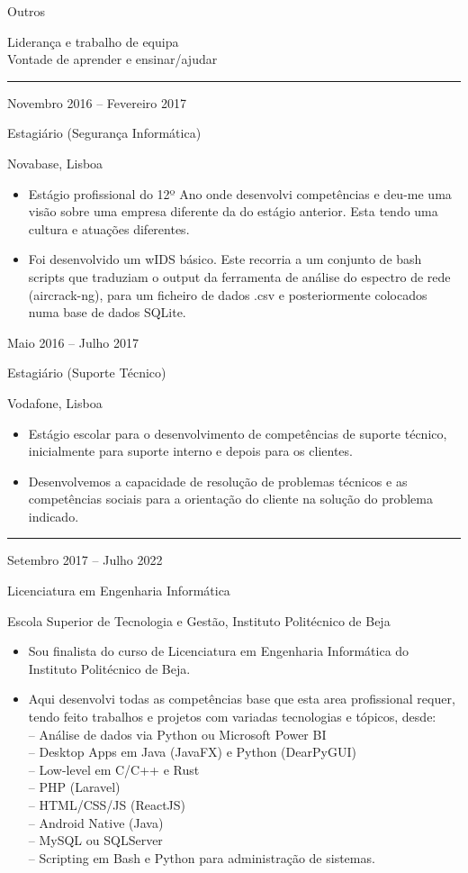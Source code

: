 \documentclass[a4paper,10pt]{article}
\newlength{\cvcolumngapwidth}
\newlength{\cvleftcolumnwidth}
\newlength{\cvrightcolumnwidth}
\newcommand{\cvsectionstyle}[1]{{\normalsize\cvsectionfont\textcolor{cvsectioncolor}{#1}}}
\newcommand{\cvtitlestyle}[1]{{\large\cvtitlefont\textcolor{cvtitlecolor}{#1}}}
\newcommand{\cvdurationstyle}[1]{{\small\cvdurationfont\textcolor{cvdurationcolor}{#1}}}
\newlength{\cvafteritemskipamount}
\newlength{\cvaftersectionskipamount}
\newlength{\cvaftertitleskipamount}
\newlength{\cvparskip}
\newcommand{\cvsection}[1]{

    \begin{minipage}[t]{\cvleftcolumnwidth}
        \raggedleft\cvsectionstyle{#1}
    \end{minipage}
    \hspace{\cvcolumngapwidth}
    \begin{minipage}[t]{\cvrightcolumnwidth}
        \textcolor{cvrulecolor}{\rule{\cvrightcolumnwidth}{0.3mm}}
    \end{minipage}

    \vspace{\cvaftersectionskipamount}
}
\newcommand{\cvitem}[2]{

    \begin{minipage}[t]{\cvleftcolumnwidth}
        \raggedleft #1
    \end{minipage}
    \hspace{\cvcolumngapwidth}
    \begin{minipage}[t]{\cvrightcolumnwidth}
        \setlength{\parskip}{\cvparskip} #2
    \end{minipage}

    \vspace{\cvafteritemskipamount}
}
\newcommand{\cvtitle}[1]{

    \cvtitlestyle{#1}

    \vspace{\cvaftertitleskipamount}

    \vspace{-\cvparskip}
}
\begin{document}
\cvitem{
    \cvdurationstyle{Outros}
}{
    Liderança e trabalho de equipa\\
    Vontade de aprender e ensinar/ajudar
}
\cvsection{EXPERIÊNCIA}
\cvitem{
    \cvdurationstyle{Novembro 2016 -- Fevereiro 2017}
}{
    \cvtitle{Estagiário (Segurança Informática)}
    Novabase, Lisboa
    \begin{itemize}[leftmargin=*]
        \item Estágio profissional do 12º Ano onde desenvolvi competências e deu-me uma visão sobre uma empresa diferente da do estágio anterior. Esta tendo uma cultura e atuações diferentes.
        \item Foi desenvolvido um wIDS básico. Este recorria a um conjunto de bash scripts que traduziam o output da ferramenta de análise do espectro de rede (aircrack-ng), para um ficheiro de dados .csv e posteriormente colocados numa base de dados SQLite.
    \end{itemize}
}
\cvitem{
    \cvdurationstyle{Maio 2016 -- Julho 2017}
}{
    \cvtitle{Estagiário (Suporte Técnico)}
    Vodafone, Lisboa
    \begin{itemize}[leftmargin=*]
        \item Estágio escolar para o desenvolvimento de competências de suporte técnico, inicialmente para suporte interno e depois para os clientes.
        \item Desenvolvemos a capacidade de resolução de problemas técnicos e as competências sociais para a orientação do cliente na solução do problema indicado.
    \end{itemize}
}
\newpage
\cvsection{EDUCAÇÃO}
\cvitem{
    \cvdurationstyle{Setembro 2017 -- Julho 2022}
}{
    \cvtitle{Licenciatura em Engenharia Informática}
    Escola Superior de Tecnologia e Gestão, Instituto Politécnico de Beja
    \begin{itemize}[leftmargin=*]
        \item Sou finalista do curso de Licenciatura em Engenharia Informática do Instituto Politécnico de Beja.
        \item Aqui desenvolvi todas as competências base que esta area profissional requer, tendo feito trabalhos e projetos com variadas tecnologias e tópicos, desde:
        \\-- Análise de dados via Python ou Microsoft Power BI\@
        \\-- Desktop Apps em Java (JavaFX) e Python (DearPyGUI)\@
        \\-- Low-level em C/C++ e Rust\@
        \\-- PHP (Laravel)\@
        \\-- HTML/CSS/JS (ReactJS)\@
        \\-- Android Native (Java)\@
        \\-- MySQL ou SQLServer\@
        \\-- Scripting em Bash e Python para administração de sistemas.
    \end{itemize}
}
\end{document}
